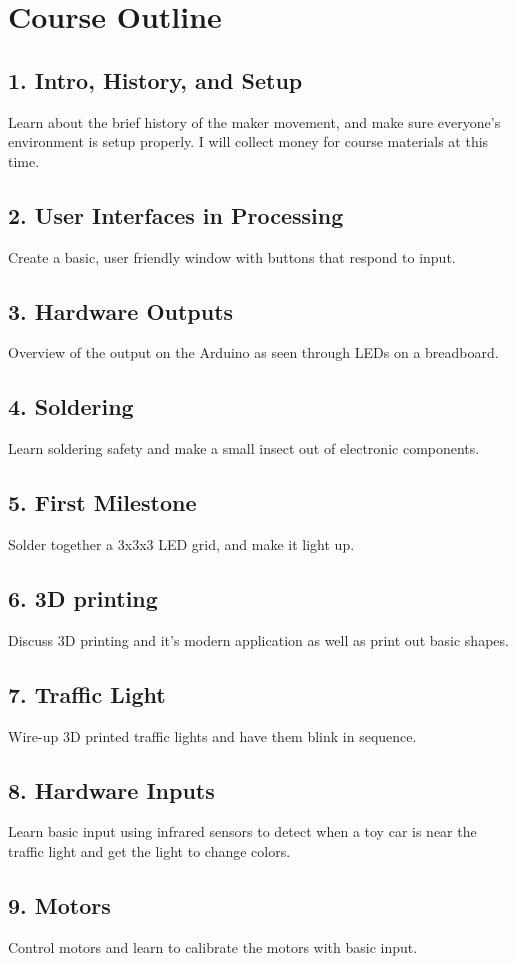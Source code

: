 \documentclass[12pt,letterpaper]{report}
\begin{document}
\section*{Course Outline}
\subsection*{1. Intro, History, and Setup}
Learn about the brief history of the maker movement, and make sure everyone's environment is setup properly. I will collect money for course materials at this time.
\subsection*{2. User Interfaces in Processing}
Create a basic, user friendly window with buttons that respond to input.
\subsection*{3. Hardware Outputs}
Overview of the output on the Arduino as seen through LEDs on a breadboard.
\subsection*{4. Soldering}
Learn soldering safety and make a small insect out of electronic components.
\subsection*{5. First Milestone}
Solder together a 3x3x3 LED grid, and make it light up.
\subsection*{6. 3D printing}
Discuss 3D printing and it's modern application as well as print out basic shapes.
\subsection*{7. Traffic Light}
Wire-up 3D printed traffic lights and have them blink in sequence.
\subsection*{8. Hardware Inputs}
Learn basic input using infrared sensors to detect when a toy car is near the traffic light and get the light to change colors.
\subsection*{9. Motors}
Control motors and learn to calibrate the motors with basic input.
\end{document}
